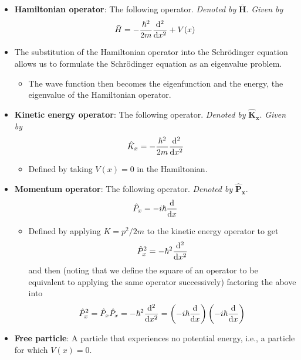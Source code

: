\documentclass[../notes.tex]{subfiles}
\begin{document}
\begin{itemize}
    \item \textbf{Hamiltonian operator}: The following operator. \emph{Denoted by} $\bm{\bar{H}}$. \emph{Given by}
    \begin{equation*}
        \bar{H} = -\frac{\hbar^2}{2m}\dv[2]{x}+V(x)
    \end{equation*}
    \item The substitution of the Hamiltonian operator into the Schr\"{o}dinger equation allows us to formulate the Schr\"{o}dinger equation as an eigenvalue problem.
    \begin{itemize}
        \item The wave function then becomes the eigenfunction and the energy, the eigenvalue of the Hamiltonian operator.
    \end{itemize}
    \item \textbf{Kinetic energy operator}: The following operator. \emph{Denoted by} $\bm{\hat{K}_x}$. \emph{Given by}
    \begin{equation*}
        \hat{K}_x = -\frac{\hbar^2}{2m}\dv[2]{x}
    \end{equation*}
    \begin{itemize}
        \item Defined by taking $V(x)=0$ in the Hamiltonian.
    \end{itemize}
    \item \textbf{Momentum operator}: The following operator. \emph{Denoted by} $\bm{\hat{P}_x}$.
    \begin{equation*}
        \hat{P}_x = -i\hbar\dv{x}
    \end{equation*}
    \begin{itemize}
        \item Defined by applying $K=p^2/2m$ to the kinetic energy operator to get
        \begin{equation*}
            \hat{P}_x^2 = -\hbar^2\dv[2]{x}
        \end{equation*}
        and then (noting that we define the square of an operator to be equivalent to applying the same operator successively) factoring the above into
        \begin{equation*}
            \hat{P}_x^2 = \hat{P}_x\hat{P}_x = -\hbar^2\dv[2]{x} = \left( -i\hbar\dv{x} \right)\left( -i\hbar\dv{x} \right)
        \end{equation*}
    \end{itemize}
    \item \textbf{Free particle}: A particle that experiences no potential energy, i.e., a particle for which $V(x)=0$.

\end{itemize}
\end{document}

